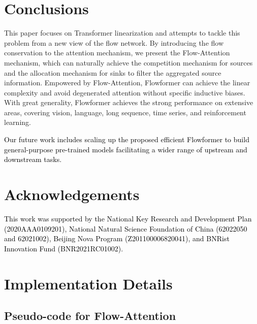 \documentclass[nohyperref]{article}
\theoremstyle{plain}
\theoremstyle{definition}
\theoremstyle{remark}
\newcommand{\update}[1]{{\textcolor{black}{#1}}}
\begin{document}
\section{Conclusions}

This paper focuses on Transformer linearization and attempts to tackle this problem from a new view of the flow network. By introducing the flow conservation to the attention mechanism, we present the Flow-Attention mechanism, which can naturally achieve the competition mechanism for sources and the allocation mechanism for sinks to filter the aggregated source information. Empowered by Flow-Attention, Flowformer can achieve the linear complexity and avoid degenerated attention without specific inductive biases. With great generality, Flowformer achieves the strong performance on extensive areas, covering vision, language, long sequence, time series, and reinforcement learning.

\update{Our future work includes scaling up the proposed efficient Flowformer to build general-purpose pre-trained models facilitating a wider range of upstream and downstream tasks.}


\section*{Acknowledgements}
\update{This work was supported by the National Key Research and Development Plan (2020AAA0109201), National Natural Science Foundation of China (62022050 and 62021002), Beijing Nova Program (Z201100006820041), and BNRist Innovation Fund (BNR2021RC01002).}





\newpage
\appendix
\onecolumn





\section{Implementation Details}\label{appendix:details}

\subsection{Pseudo-code for Flow-Attention}
\end{document}
